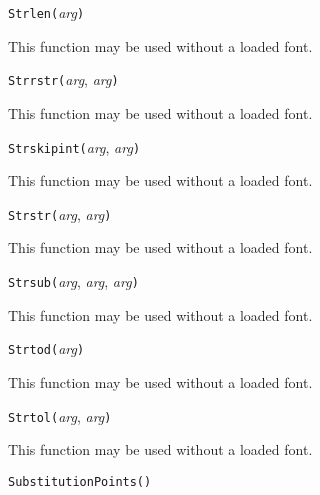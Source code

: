 

\texttt{Strlen(}\textit{arg}\texttt{)}

This function may be used without a loaded font.



\texttt{Strrstr(}\textit{arg}, \textit{arg}\texttt{)}

This function may be used without a loaded font.



\texttt{Strskipint(}\textit{arg}, \textit{arg}\texttt{)}

This function may be used without a loaded font.



\texttt{Strstr(}\textit{arg}, \textit{arg}\texttt{)}

This function may be used without a loaded font.



\texttt{Strsub(}\textit{arg}, \textit{arg}, \textit{arg}\texttt{)}

This function may be used without a loaded font.



\texttt{Strtod(}\textit{arg}\texttt{)}

This function may be used without a loaded font.



\texttt{Strtol(}\textit{arg}, \textit{arg}\texttt{)}

This function may be used without a loaded font.



\texttt{SubstitutionPoints(}\texttt{)}



